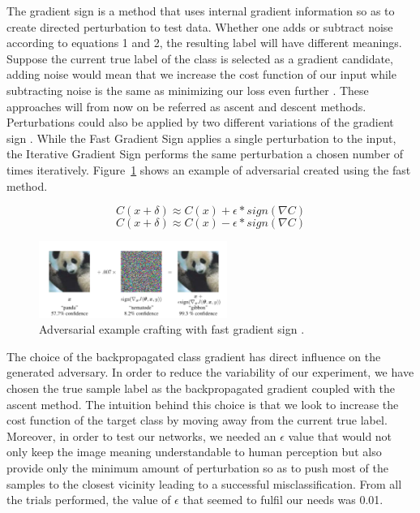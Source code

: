 \documentclass[runningheads,a4paper]{llncs}
\begin{document}
The gradient sign is a method that uses internal gradient information so as to create directed perturbation to test data. Whether one adds or subtract noise according to equations 1 and 2, the resulting label will have different meanings. Suppose the current true label of the class is selected as a gradient candidate, adding noise would mean that we increase the cost function of our input while subtracting noise is the same as minimizing our loss even further \cite{goodfellow2016_book}. These approaches will from now on be referred as ascent and descent methods. Perturbations could also be applied by two different variations of the gradient sign \cite{goodfellow2014}. While the Fast Gradient Sign applies a single perturbation to the input, the Iterative Gradient Sign performs the same perturbation a chosen number of times iteratively. Figure~\ref{fig:fgsm_craft} shows an example of adversarial created using the fast method.


\begin{equation}
C(x + \delta)\approx C(x) + \epsilon * sign(\nabla C)
\end{equation}
\begin{equation}
C(x + \delta)\approx C(x) - \epsilon * sign(\nabla C)
\end{equation}
\begin{figure}
	\centering
	\includegraphics[height=2.5cm]{panda.png}
	\caption{Adversarial example crafting with fast gradient sign \cite{goodfellow2014}.}
	\label{fig:fgsm_craft}
\end{figure}

The choice of the backpropagated class gradient has direct influence on the generated adversary. In order to reduce the variability of our experiment, we have chosen the true sample label as the backpropagated gradient coupled with the ascent method. The intuition behind this choice is that we look to increase the cost function of the target class by moving away from the current true label. Moreover, in order to test our networks, we needed an $\epsilon$ value that would not only keep the image meaning understandable to human perception but also provide only the minimum amount of perturbation so as to push most of the samples to the closest vicinity leading to a successful misclassification. From all the trials performed, the value of $\epsilon$ that seemed to fulfil our needs was 0.01. 
\end{document}
